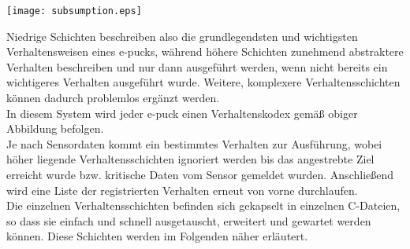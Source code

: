 \documentclass[10pt,a4paper]{article}
\begin{document}
			\texttt{[image: subsumption.eps]}

			Niedrige Schichten beschreiben also die grundlegendsten und wichtigsten Verhaltensweisen eines e-pucks, während höhere Schichten zunehmend
			abstraktere Verhalten beschreiben und nur dann ausgeführt werden, wenn nicht bereits ein wichtigeres Verhalten ausgeführt wurde. Weitere,
			komplexere Verhaltensschichten können dadurch problemlos ergänzt werden.\\ 
			In diesem System wird jeder e-puck einen Verhaltenskodex gemäß obiger Abbildung befolgen. \\
			Je nach Sensordaten kommt ein bestimmtes Verhalten zur Ausführung, wobei höher liegende Verhaltensschichten ignoriert werden bis das
			angestrebte Ziel erreicht wurde bzw. kritische Daten vom Sensor gemeldet wurden. Anschließend wird eine Liste der registrierten Verhalten
			erneut von vorne durchlaufen. \\
			Die einzelnen Verhaltensschichten befinden sich gekapselt in einzelnen C-Dateien, so dass sie einfach und schnell ausgetauscht, erweitert und
			gewartet werden können. Diese Schichten werden im Folgenden näher erläutert. \\
\end{document}
